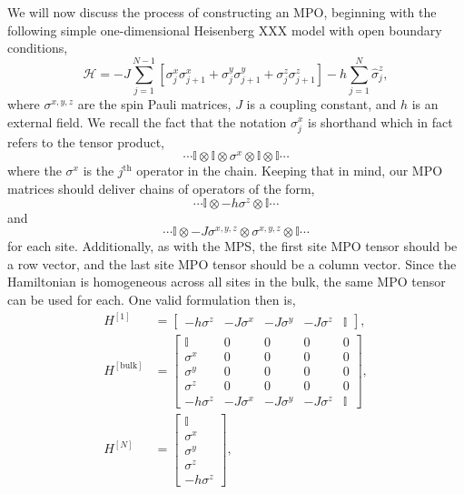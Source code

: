  We will now discuss the process of constructing an MPO, beginning with the following simple one-dimensional Heisenberg XXX model with open boundary conditions,
 \begin{equation}
 	\mathcal {H} = -J \sum_{j=1}^{N-1} \left[ \sigma^{x}_{j}\sigma^{x}_{j+1} + \sigma^{y}_{j}\sigma^{y}_{j+1} + \sigma^{z}_{j}\sigma^{z}_{j+1} \right] - h \sum_{j=1}^{N} \hat{\sigma}^{z}_{j},
 	\label{eq:mpo1-1}
 \end{equation}
 where \(\sigma^{x,y,z}\) are the spin Pauli matrices, \(J\) is a coupling constant, and \(h\) is an external field. We recall the fact that the notation \(\sigma^{x}_{j}\) is shorthand which in fact refers to the tensor product,
 \begin{equation*}
 	\cdots \mathbb{I} \otimes \mathbb{I} \otimes \sigma^{x} \otimes \mathbb{I} \otimes \mathbb{I} \cdots
 \end{equation*}
 where the \(\sigma^{x}\) is the \(j^{\mathrm{th}}\) operator in the chain. Keeping that in mind, our MPO matrices should deliver chains of operators of the form,
 \begin{equation*}
 	\cdots \mathbb{I} \otimes -h\sigma^{z} \otimes \mathbb{I} \cdots
 \end{equation*}
 and
 \begin{equation*}
 	\cdots \mathbb{I} \otimes -J\sigma^{x,y,z} \otimes \sigma^{x,y,z} \otimes \mathbb{I} \cdots
 \end{equation*}
 for each site. Additionally, as with the MPS, the first site MPO tensor should be a row vector, and the last site MPO tensor should be a column vector. Since the Hamiltonian is homogeneous across all sites in the bulk, the same MPO tensor can be used for each. One valid formulation then is,
 \begin{align}
 	H^{[1]} &= \begin{bmatrix} -h\sigma^{z} & -J\sigma^{x} & -J\sigma^{y} & -J\sigma^{z} & \mathbb{I} \end{bmatrix}, \label{eq:mpo1-2} \\
 	H^{[\mathrm{bulk}]} &= \begin{bmatrix} \mathbb{I} & 0 & 0 & 0 & 0 \\
 										   \sigma^{x} & 0 & 0 & 0 & 0 \\
 										   \sigma^{y} & 0 & 0 & 0 & 0 \\
 										   \sigma^{z} & 0 & 0 & 0 & 0 \\
 										    -h\sigma^{z} & -J\sigma^{x} & -J\sigma^{y} & -J\sigma^{z} & \mathbb{I}
 							\end{bmatrix}, \label{eq:mpo1-3} \\
 	H^{[N]} &= \begin{bmatrix} \mathbb{I} \\ \sigma^{x} \\ \sigma^{y} \\ \sigma^{z} \\ -h\sigma^{z} \end{bmatrix}, \label{eq:mpo1-4}
 \end{align}
